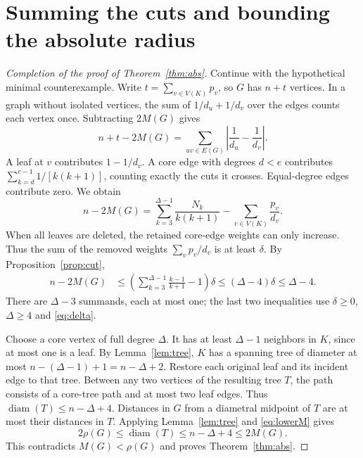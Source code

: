 \documentclass[11pt,a4paper]{article}
\newcommand{\diam}{\operatorname{diam}}
\begin{document}
\section{Summing the cuts and bounding the absolute radius}\label{sec:sum}
\begin{proof}[Completion of the proof of Theorem~\ref{thm:abs}]
Continue with the hypothetical minimal counterexample. Write
$t=\sum_{v\in V(K)}p_v$, so $G$ has $n+t$ vertices. In a graph
without isolated vertices, the sum of $1/d_u+1/d_v$ over the edges
counts each vertex once. Subtracting $2M(G)$ gives
\[
 n+t-2M(G)=\sum_{uv\in E(G)}\left|\frac1{d_u}-\frac1{d_v}\right|.
\]
A leaf at $v$ contributes $1-1/d_v$. A core edge with degrees
$d<e$ contributes $\sum_{k=d}^{e-1}1/[k(k+1)]$, counting exactly
the cuts it crosses. Equal-degree edges contribute zero. We obtain
\begin{equation}\label{eq:sum}
 n-2M(G)=\sum_{k=3}^{\Delta-1}\frac{N_k}{k(k+1)}
                     -\sum_{v\in V(K)}\frac{p_v}{d_v}.
\end{equation}
When all leaves are deleted, the retained core-edge weights can only
increase. Thus the sum of the removed weights $\sum_v p_v/d_v$ is at
least $\delta$. By Proposition~\ref{prop:cut},
\begin{align}
 n-2M(G)
 &\le \left(\sum_{k=3}^{\Delta-1}\frac{k-1}{k+1}-1\right)\delta
 \le(\Delta-4)\delta
 \le\Delta-4 . \label{eq:lowerM}
\end{align}
There are $\Delta-3$ summands, each at most one; the last two
inequalities use $\delta\ge0$, $\Delta\ge4$ and \eqref{eq:delta}.

Choose a core vertex of full degree $\Delta$. It has at least
$\Delta-1$ neighbors in $K$, since at most one is a leaf. By
Lemma~\ref{lem:tree}, $K$ has a spanning tree of diameter at most
$n-(\Delta-1)+1=n-\Delta+2$. Restore each original leaf and its
incident edge to that tree. Between any two vertices of the resulting
tree $T$, the path consists of a core-tree path and at most two leaf
edges. Thus $\diam(T)\le n-\Delta+4$. Distances in $G$ from a
diametral midpoint of $T$ are at most their distances in $T$. Applying
Lemma~\ref{lem:tree} and \eqref{eq:lowerM} gives
\begin{equation}\label{eq:contradiction}
 2\rho(G)\le\diam(T)\le n-\Delta+4\le 2M(G).
\end{equation}
This contradicts $M(G)<\rho(G)$ and proves Theorem~\ref{thm:abs}.
\end{proof}
\end{document}
